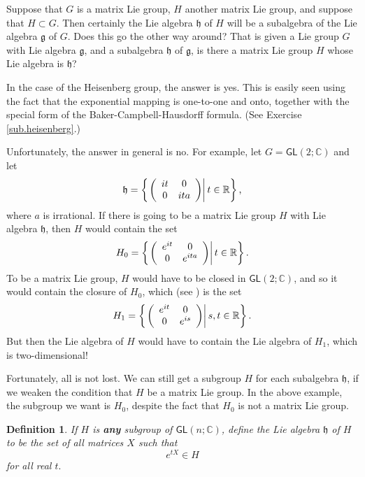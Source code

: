 \documentclass[12pt]{amsbook}
\let \frak = \mathfrak
\theoremstyle{plain}
\newtheorem{definition}[theorem]{Definition}
\numberwithin{equation}{chapter}
\numberwithin{theorem}{chapter}
\begin{document}
Suppose that $G$ is a matrix Lie group, $H$ another matrix Lie group, and
suppose that $H\subset G$. Then certainly the Lie algebra $\frak{h}$ of $H$
will be a subalgebra of the Lie algebra $\frak{g}$ of $G$. Does this go the
other way around? That is given a Lie group $G$ with Lie algebra $\frak{g}$,
and a subalgebra $\frak{h}$ of $\frak{g}$, is there a matrix Lie group $H$
whose Lie algebra is $\frak{h}$?

In the case of the Heisenberg group, the answer is yes. This is easily seen
using the fact that the exponential mapping is one-to-one and onto, together
with the special form of the Baker-Campbell-Hausdorff formula. (See Exercise
\ref{sub.heisenberg}.)

Unfortunately, the answer in general is no. For example, let $G=\mathsf{GL}%
\left(  2;\mathbb{C}\right)  $ and let
\[
\frak{h}=\left\{  \left.  \left(
\begin{array}
[c]{cc}%
it & 0\\
0 & ita
\end{array}
\right)  \right|  t\in\mathbb{R}\right\}  \text{,}%
\]
where $a$ is irrational. If there is going to be a matrix Lie group $H$ with
Lie algebra $\frak{h}$, then $H$ would contain the set
\[
H_{0}=\left\{  \left.  \left(
\begin{array}
[c]{cc}%
e^{it} & 0\\
0 & e^{ita}%
\end{array}
\right)  \right|  t\in\mathbb{R}\right\}  \text{.}%
\]
To be a matrix Lie group, $H$ would have to be closed in $\mathsf{GL}\left(
2;\mathbb{C}\right)  $, and so it would contain the closure of $H_{0}$, which
(see ) is the set
\[
H_{1}=\left\{  \left.  \left(
\begin{array}
[c]{cc}%
e^{it} & 0\\
0 & e^{is}%
\end{array}
\right)  \right|  s,t\in\mathbb{R}\right\}  \text{.}%
\]
But then the Lie algebra of $H$ would have to contain the Lie algebra of
$H_{1}$, which is two-dimensional!

Fortunately, all is not lost. We can still get a subgroup $H$ for each
subalgebra $\frak{h}$, if we weaken the condition that $H$ be a matrix Lie
group. In the above example, the subgroup we want is $H_{0}$, despite the fact
that $H_{0}$ is not a matrix Lie group.

\begin{definition}
If $H$ is \textbf{any} subgroup of $\mathsf{GL}\left(  n;\mathbb{C}\right)  $,
define the Lie algebra $\frak{h}$ of $H$ to be the set of all matrices $X$
such that
\[
e^{tX}\in H
\]
for all real $t.$
\end{definition}
\end{document}
